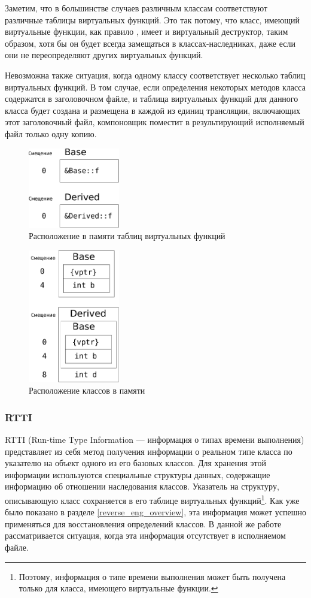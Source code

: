 \documentclass[a4paper,12pt,russian]{article}
\begin{document}
Заметим, что в большинстве случаев различным классам соответствуют различные таблицы виртуальных функций.
Это так потому, что класс, имеющий виртуальные функции, как правило \cite{meyers}, имеет и виртуальный деструктор, таким образом, хотя бы он будет всегда замещаться в классах-наследниках, даже если они не переопределяют других виртуальных функций.

Невозможна также ситуация, когда одному классу соответствует несколько таблиц виртуальных функций.
В том случае, если определения некоторых методов класса содержатся в заголовочном файле, и таблица виртуальных функций для данного класса будет создана и размещена в каждой из единиц трансляции, включающих этот заголовочный файл, компоновщик поместит в результирующий исполняемый файл только одну копию.

\begin{figure}
  \center
  \includegraphics[width=4cm]{simple_vtables.pdf}
  \hfill
  \caption{Расположение в памяти таблиц виртуальных функций}
  \label{simple_vtables_fig}
\end{figure}

\begin{figure}[t]
  \center
  \includegraphics[width=4cm]{simple_mem_layout.pdf}
  \hfill
  \caption{Расположение классов в памяти}
  \label{memlayout_fig}
\end{figure}

\subsubsection{RTTI}
RTTI (Run-time Type Information --- информация о типах времени выполнения) представляет из себя метод получения информации о реальном типе класса по указателю на объект одного из его базовых классов.
Для хранения этой информации используются специальные структуры данных, содержащие информацию об отношении наследования классов.
Указатель на структуру, описывающую класс сохраняется в его таблице виртуальных функций\footnote{Поэтому, информация о типе времени выполнения может быть получена только для класса, имеющего виртуальные функции.}.
Как уже было показано в разделе \ref{reverse_eng_overview}, эта информация может успешно применяться для восстановления определений классов.
В данной же работе рассматривается ситуация, когда эта информация отсутствует в исполняемом файле.
\end{document}
